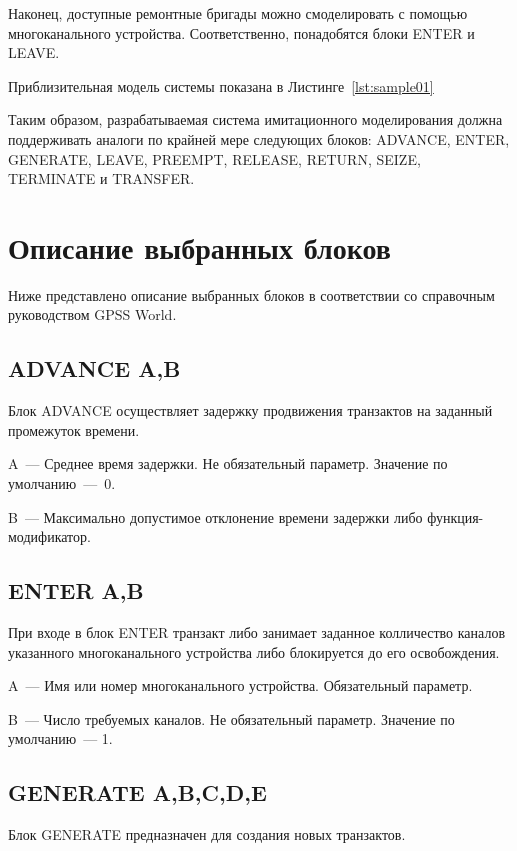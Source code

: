 Наконец, доступные ремонтные бригады можно смоделировать с помощью многоканального устройства. Соответственно, понадобятся блоки ENTER и LEAVE.

Приблизительная модель системы показана в Листинге~\ref{lst:sample01}



Таким образом, разрабатываемая система имитационного моделирования должна поддерживать аналоги по крайней мере следующих блоков: ADVANCE, ENTER, GENERATE, LEAVE, PREEMPT, RELEASE, RETURN, SEIZE, TERMINATE и TRANSFER.

\section{Описание выбранных блоков}

Ниже представлено описание выбранных блоков в соответствии со справочным руководством GPSS World.\cite{GPSSRef}

\subsection*{ADVANCE A,B}

Блок ADVANCE осуществляет задержку продвижения транзактов на заданный промежуток времени.

A~--- Среднее время задержки. Не обязательный параметр. Значение по умолчанию~---~0.

B~--- Максимально допустимое отклонение времени задержки либо функция-модификатор.

\subsection*{ENTER A,B}

При входе в блок ENTER транзакт либо занимает заданное колличество каналов указанного многоканального устройства либо блокируется до его освобождения.

A~--- Имя или номер многоканального устройства. Обязательный параметр.

B~--- Число требуемых каналов. Не обязательный параметр. Значение по умолчанию~--- 1.

\subsection*{GENERATE A,B,C,D,E}

Блок GENERATE предназначен для создания новых транзактов.

